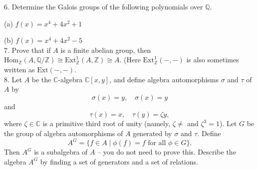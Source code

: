 \documentclass[11pt]{article}
\newcommand{\Z}{\mathbb{Z}}
\newcommand{\Q}{\mathbb{Q}}
\newcommand{\C}{\mathbb{C}}
\begin{document}
6. Determine the Galois groups of the following polynomials over $\Q$.

(a) $f(x) = x^4+4x^2+1$

(b) $f(x) = x^4 +4x^2 -5$\\

7. Prove that if $A$ is a finite abelian group, then $\mbox{Hom}_\Z(A,\Q/\Z)\cong \mbox{Ext}_\Z^1(A,\Z) \cong A$. (Here $\mbox{Ext}_\Z^1(-,-)$ is also sometimes written as $\mbox{Ext}(-,-)$. \\

8. Let $A$ be the $\C$-algebra $\C[x,y]$, and define algebra automorphisms $\sigma$ and $\tau$ of $A$ by \[
\sigma(x)= y, \quad \sigma(x) = y
\]
and \[
\tau(x) = x,\quad \tau(y) = \zeta y,
\]
where $\zeta\in \C$ is a primitive third root of unity (namely, $\zeta \neq $ and $\zeta^3 = 1$). Let $G$ be the group of algebra automorphisms of $A$ generated by $\sigma$ and $\tau$. Define \[
A^G = \{f\in A \mid \phi(f) = f\text{ for all } \phi\in G\}.
\]
Then $A^G$ is a subalgebra of $A$ -- you do not need to prove this. Describe the algebra $A^G$ by finding a set of generators and a set of relations. 
\end{document}
